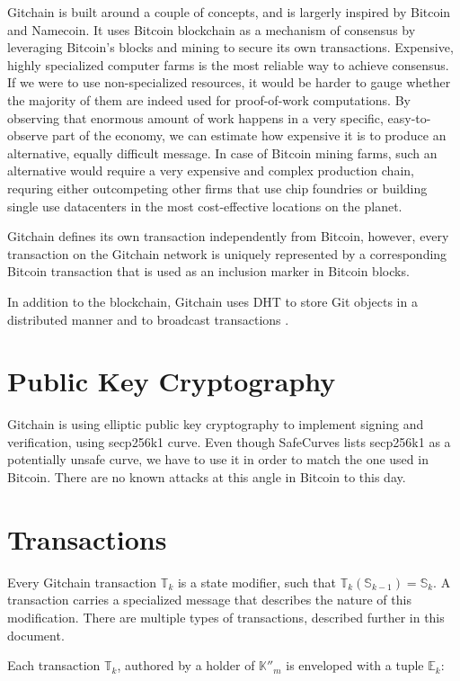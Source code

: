 \documentclass[a4paper]{article}
\newcommand{\Gtxs}{\mathbb{T}}
\newcommand{\Genvs}{\mathbb{E}}
\newcommand{\Gstates}{\mathbb{S}}
\newcommand{\Gprivkeys}{\mathbb{K}{''}}
\begin{document}
Gitchain is built around a couple of concepts, and is largerly inspired by Bitcoin and Namecoin. It uses Bitcoin blockchain as a mechanism of consensus by leveraging Bitcoin's blocks and mining to secure its own transactions. Expensive, highly specialized computer farms is the most reliable way to achieve consensus. If we were to use non-specialized resources, it would be harder to gauge whether the majority of them are indeed used for proof-of-work computations. By observing that enormous amount of work happens in a very specific, easy-to-observe part of the economy, we can estimate how expensive it is to produce an alternative, equally difficult message. In case of Bitcoin mining farms, such an alternative would require a very expensive and complex production chain, requring either outcompeting other firms that use chip foundries or building single use datacenters in the most cost-effective locations on the planet.

Gitchain defines its own transaction independently from Bitcoin, however, every transaction on the Gitchain network is uniquely represented by a corresponding Bitcoin transaction that is used as an inclusion marker in Bitcoin blocks.

In addition to the blockchain, Gitchain uses DHT to store Git objects in a distributed manner and to broadcast transactions \cite{elansary}.

\section{Public Key Cryptography}

Gitchain is using elliptic public key cryptography to implement signing and verification, using secp256k1 curve. Even though SafeCurves \cite{safecurves} lists secp256k1 as a potentially unsafe curve, we have to use it in order to match the one used in Bitcoin. There are no known attacks at this angle in Bitcoin to this day.

\section{Transactions}

Every Gitchain transaction $\Gtxs_{k}$ is a state modifier, such that $\Gtxs_{k}(\Gstates_{k-1}) = \Gstates_{k}$. A transaction
carries a specialized message that describes the nature of this modification. There are multiple types of transactions, described further
in this document.

Each transaction $\Gtxs_{k}$, authored by a holder of $\Gprivkeys_{m}$ is enveloped with a tuple $\Genvs_{k}$:
\end{document}
